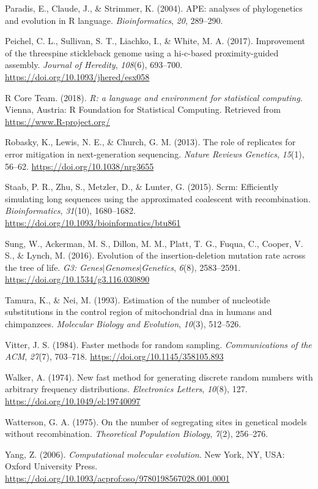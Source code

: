 \documentclass[12pt,]{article}
\begin{document}
\leavevmode\hypertarget{ref-Paradis_2004}{}%
Paradis, E., Claude, J., \& Strimmer, K. (2004). APE: analyses of
phylogenetics and evolution in R language. \emph{Bioinformatics},
\emph{20}, 289--290.

\leavevmode\hypertarget{ref-Peichel_2017}{}%
Peichel, C. L., Sullivan, S. T., Liachko, I., \& White, M. A. (2017).
Improvement of the threespine stickleback genome using a hi-c-based
proximity-guided assembly. \emph{Journal of Heredity}, \emph{108}(6),
693--700. \url{https://doi.org/10.1093/jhered/esx058}

\leavevmode\hypertarget{ref-R_Core_Team_2018}{}%
R Core Team. (2018). \emph{R: a language and environment for statistical
computing}. Vienna, Austria: R Foundation for Statistical Computing.
Retrieved from \url{https://www.R-project.org/}

\leavevmode\hypertarget{ref-Robasky_2013}{}%
Robasky, K., Lewis, N. E., \& Church, G. M. (2013). The role of
replicates for error mitigation in next-generation sequencing.
\emph{Nature Reviews Genetics}, \emph{15}(1), 56--62.
\url{https://doi.org/10.1038/nrg3655}

\leavevmode\hypertarget{ref-Staab_2015}{}%
Staab, P. R., Zhu, S., Metzler, D., \& Lunter, G. (2015). Scrm:
Efficiently simulating long sequences using the approximated coalescent
with recombination. \emph{Bioinformatics}, \emph{31}(10), 1680--1682.
\url{https://doi.org/10.1093/bioinformatics/btu861}

\leavevmode\hypertarget{ref-Sung_2016}{}%
Sung, W., Ackerman, M. S., Dillon, M. M., Platt, T. G., Fuqua, C.,
Cooper, V. S., \& Lynch, M. (2016). Evolution of the insertion-deletion
mutation rate across the tree of life. \emph{G3:
Genes\(\vert\)Genomes\(\vert\)Genetics}, \emph{6}(8), 2583--2591.
\url{https://doi.org/10.1534/g3.116.030890}

\leavevmode\hypertarget{ref-TN93}{}%
Tamura, K., \& Nei, M. (1993). Estimation of the number of nucleotide
substitutions in the control region of mitochondrial dna in humans and
chimpanzees. \emph{Molecular Biology and Evolution}, \emph{10}(3),
512--526.

\leavevmode\hypertarget{ref-Vitter_1984}{}%
Vitter, J. S. (1984). Faster methods for random sampling.
\emph{Communications of the ACM}, \emph{27}(7), 703--718.
\url{https://doi.org/10.1145/358105.893}

\leavevmode\hypertarget{ref-Walker_1974}{}%
Walker, A. (1974). New fast method for generating discrete random
numbers with arbitrary frequency distributions. \emph{Electronics
Letters}, \emph{10}(8), 127. \url{https://doi.org/10.1049/el:19740097}

\leavevmode\hypertarget{ref-Watterson}{}%
Watterson, G. A. (1975). On the number of segregating sites in genetical
models without recombination. \emph{Theoretical Population Biology},
\emph{7}(2), 256--276.

\leavevmode\hypertarget{ref-Yang_2006}{}%
Yang, Z. (2006). \emph{Computational molecular evolution}. New York, NY,
USA: Oxford University Press.
\url{https://doi.org/10.1093/acprof:oso/9780198567028.001.0001}
\end{document}
